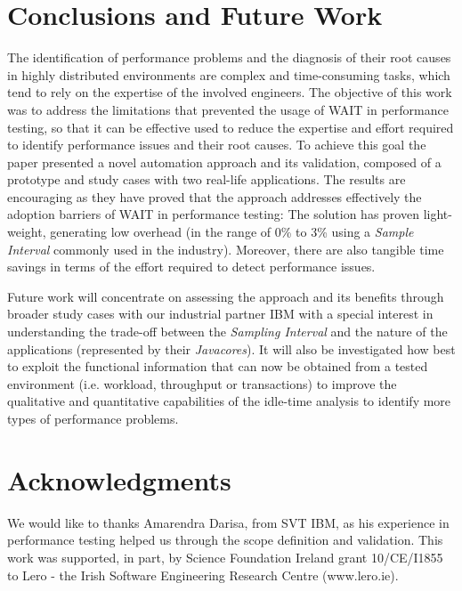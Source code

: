 \documentclass[runningheads,a4paper]{llncs}
\begin{document}
\vspace{-5pt}
\section{Conclusions and Future Work}
\vspace{-5pt}
The identification of performance problems and the diagnosis of their root
causes in highly distributed environments are complex and time-consuming tasks,
which tend to rely on the expertise of the involved engineers. The objective of
this work was to address the limitations that prevented the usage of WAIT in
performance testing, so that it can be effective used to reduce the expertise
and effort required to identify performance issues and their root causes. To
achieve this goal the paper presented a novel automation approach and its
validation, composed of a prototype and study cases with two real-life
applications. The results are encouraging as they have proved that the approach
addresses effectively the adoption barriers of WAIT in performance testing: The
solution has proven light-weight, generating low overhead (in the range of 0\%
to 3\% using a \emph{Sample Interval} commonly used in the industry). Moreover,
there are also tangible time savings in terms of the effort required to detect
performance issues.

Future work will concentrate on assessing the approach and its benefits through
broader study cases with our industrial partner IBM with a special interest in
understanding the trade-off between the \emph{Sampling Interval} and the nature
of the applications (represented by their \emph{Javacores}). It will also be
investigated how best to exploit the functional information that can now be
obtained from a tested environment (i.e. workload, throughput or transactions)
to improve the qualitative and quantitative capabilities of the idle-time
analysis to identify more types of performance problems.

\vspace{-5pt}
\section*{Acknowledgments}
\vspace{-5pt}
We would like to thanks Amarendra Darisa, from SVT IBM, as his experience in
performance testing helped us through the scope definition and validation. This
work was supported, in part, by Science Foundation Ireland grant 10/CE/I1855 to Lero - the Irish Software Engineering Research Centre (www.lero.ie).




\end{document}
